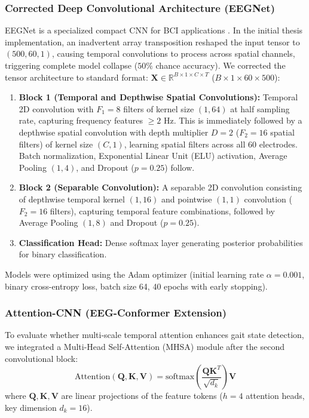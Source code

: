 \documentclass[review,12pt]{elsarticle}
\begin{document}
\subsubsection{Corrected Deep Convolutional Architecture (EEGNet)}
EEGNet is a specialized compact CNN for BCI applications \cite{lawhern2018eegnet}. In the initial thesis implementation, an inadvertent array transposition reshaped the input tensor to $(500, 60, 1)$, causing temporal convolutions to process across spatial channels, triggering complete model collapse ($50\%$ chance accuracy). We corrected the tensor architecture to standard format: $\mathbf{X} \in \mathbb{R}^{B \times 1 \times C \times T}$ ($B \times 1 \times 60 \times 500$):
\begin{enumerate}
    \item \textbf{Block 1 (Temporal and Depthwise Spatial Convolutions):} Temporal 2D convolution with $F_1 = 8$ filters of kernel size $(1, 64)$ at half sampling rate, capturing frequency features $\geq 2\text{ Hz}$. This is immediately followed by a depthwise spatial convolution with depth multiplier $D = 2$ ($F_2 = 16$ spatial filters) of kernel size $(C, 1)$, learning spatial filters across all 60 electrodes. Batch normalization, Exponential Linear Unit (ELU) activation, Average Pooling $(1, 4)$, and Dropout ($p=0.25$) follow.
    \item \textbf{Block 2 (Separable Convolution):} A separable 2D convolution consisting of depthwise temporal kernel $(1, 16)$ and pointwise $(1, 1)$ convolution ($F_2 = 16$ filters), capturing temporal feature combinations, followed by Average Pooling $(1, 8)$ and Dropout ($p=0.25$).
    \item \textbf{Classification Head:} Dense softmax layer generating posterior probabilities for binary classification.
\end{enumerate}
Models were optimized using the Adam optimizer (initial learning rate $\alpha = 0.001$, binary cross-entropy loss, batch size 64, 40 epochs with early stopping).

\subsubsection{Attention-CNN (EEG-Conformer Extension)}
To evaluate whether multi-scale temporal attention enhances gait state detection, we integrated a Multi-Head Self-Attention (MHSA) module after the second convolutional block:
\begin{equation}
    \text{Attention}(\mathbf{Q}, \mathbf{K}, \mathbf{V}) = \text{softmax}\left( \frac{\mathbf{Q}\mathbf{K}^T}{\sqrt{d_k}} \right) \mathbf{V}
\end{equation}
where $\mathbf{Q}, \mathbf{K}, \mathbf{V}$ are linear projections of the feature tokens ($h = 4$ attention heads, key dimension $d_k = 16$).
\end{document}
